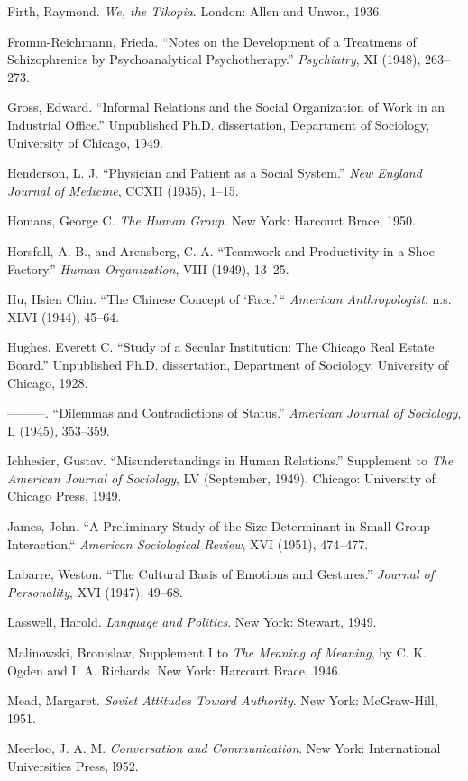 \documentclass[openany,nobib]{tufte-book}
\begin{document}
\begin{hangparas}{.25in}{1}
Firth, Raymond. \emph{We, the Tikopia}. London: Allen and Unwon, 1936.

Fromm-Reichmann, Frieda. ``Notes on the Development of a Treatmens of
Schizophrenics by Psychoanalytical Psychotherapy.'' \emph{Psychiatry},
XI (1948), 263--273.

Gross, Edward. ``Informal Relations and the Social Organization of Work
in an Industrial Office.'' Unpublished Ph.D. dissertation, Department of
Sociology, University of Chicago, 1949.

Henderson, L. J. ``Physician and Patient as a Social System.'' \emph{New
England Journal of Medicine}, CCXII (1935), 1--15.

Homans, George C. \emph{The Human Group}. New York: Harcourt Brace,
1950.

Horsfall, A. B., and Arensberg, C. A. ``Teamwork and Productivity in a
Shoe Factory.'' \emph{Human Organization}, VIII (1949), 13--25.

Hu, Hsien Chin. ``The Chinese Concept of `Face.'\,`` \emph{American
Anthropologist}, n.s. XLVI (1944), 45--64.

Hughes, Everett C. ``Study of a Secular Institution: The Chicago Real
Estate Board.'' Unpublished Ph.D. dissertation, Department of Sociology,
University of Chicago, 1928.

---------. ``Dilemmas and Contradictions of Status.'' \emph{American
Journal of Sociology}, L (1945), 353--359.

Ichhesier, Gustav. ``Misunderstandings in Human Relations.'' Supplement
to \emph{The American Journal of Sociology}, LV (September, 1949).
Chicago: University of Chicago Press, 1949.

James, John. ``A Preliminary Study of the Size Determinant in Small
Group Interaction.`` \emph{American Sociological Review}, XVI (1951),
474--477.

Labarre, Weston. ``The Cultural Basis of Emotions and Gestures.''
\emph{Journal of Personality}, XVI (1947), 49--68.

Lasswell, Harold. \emph{Language and Politics}. New York: Stewart, 1949.

Malinowski, Bronislaw, Supplement I to \emph{The Meaning of Meaning}, by
C. K. Ogden and I. A. Richards. New York: Harcourt Brace, 1946.

Mead, Margaret. \emph{Soviet Attitudes Toward Authority}. New York:
McGraw-Hill, 1951.

Meerloo, J. A. M. \emph{Conversation and Communication}. New York:
International Universities Press, l952.


\end{hangparas}
\end{document}
